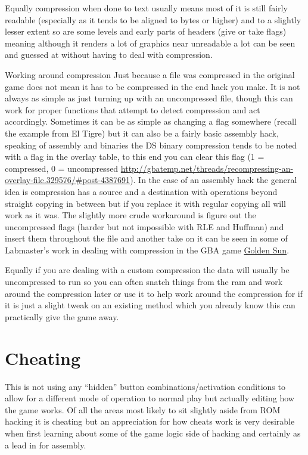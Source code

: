 \documentclass[
]{book}
\begin{document}
Equally compression when done to text usually means most of it is still fairly readable (especially as it tends to be aligned to bytes or higher) and to a slightly lesser extent so are some levels and early parts of headers (give or take flags) meaning although it renders a lot of graphics near unreadable a lot can be seen and guessed at without having to deal with compression.

Working around compression Just because a file was compressed in the original game does not mean it has to be compressed in the end hack you make. It is not always as simple as just turning up with an uncompressed file, though this can work for proper functions that attempt to detect compression and act accordingly. Sometimes it can be as simple as changing a flag somewhere (recall the example from El Tigre) but it can also be a fairly basic assembly hack, speaking of assembly and binaries the DS binary compression tends to be noted with a flag in the overlay table, to this end you can clear this flag (1 = compressed, 0 = uncompressed \url{http://gbatemp.net/threads/recompressing-an-overlay-file.329576/\#post-4387691}). In the case of an assembly hack the general idea is compression has a source and a destination with operations beyond straight copying in between but if you replace it with regular copying all will work as it was. The slightly more crude workaround is figure out the uncompressed flags (harder but not impossible with RLE and Huffman) and insert them throughout the file and another take on it can be seen in some of Labmaster's work in dealing with compression in the GBA game \href{http://www.romhacking.net/documents/253/}{Golden Sun}.

Equally if you are dealing with a custom compression the data will usually be uncompressed to run so you can often snatch things from the ram and work around the compression later or use it to help work around the compression for if it is just a slight tweak on an existing method which you already know this can practically give the game away.

\hypertarget{cheating}{%
\section{Cheating}\label{cheating}}

This is not using any ``hidden'' button combinations/activation conditions to allow for a different mode of operation to normal play but actually editing how the game works. Of all the areas most likely to sit slightly aside from ROM hacking it is cheating but an appreciation for how cheats work is very desirable when first learning about some of the game logic side of hacking and certainly as a lead in for assembly.
\end{document}
